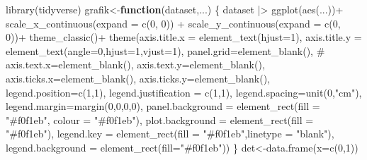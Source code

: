 \documentclass[
  letterpaper,
  DIV=11,
  numbers=noendperiod]{scrartcl}
\newenvironment{Shaded}{\begin{snugshade}}{\end{snugshade}}
\newcommand{\AttributeTok}[1]{\textcolor[rgb]{0.40,0.45,0.13}{#1}}
\newcommand{\CommentTok}[1]{\textcolor[rgb]{0.37,0.37,0.37}{#1}}
\newcommand{\ControlFlowTok}[1]{\textcolor[rgb]{0.00,0.23,0.31}{\textbf{#1}}}
\newcommand{\DecValTok}[1]{\textcolor[rgb]{0.68,0.00,0.00}{#1}}
\newcommand{\FunctionTok}[1]{\textcolor[rgb]{0.28,0.35,0.67}{#1}}
\newcommand{\NormalTok}[1]{\textcolor[rgb]{0.00,0.23,0.31}{#1}}
\newcommand{\OtherTok}[1]{\textcolor[rgb]{0.00,0.23,0.31}{#1}}
\newcommand{\SpecialCharTok}[1]{\textcolor[rgb]{0.37,0.37,0.37}{#1}}
\newcommand{\StringTok}[1]{\textcolor[rgb]{0.13,0.47,0.30}{#1}}
\begin{document}
\begin{Shaded}
\begin{Highlighting}[]
\FunctionTok{library}\NormalTok{(tidyverse)}
\NormalTok{grafik}\OtherTok{\textless{}{-}}\ControlFlowTok{function}\NormalTok{(dataset,...) \{}
\NormalTok{  dataset }\SpecialCharTok{|\textgreater{}}
    \FunctionTok{ggplot}\NormalTok{(}\FunctionTok{aes}\NormalTok{(...))}\SpecialCharTok{+}
    \FunctionTok{scale\_x\_continuous}\NormalTok{(}\AttributeTok{expand =} \FunctionTok{c}\NormalTok{(}\DecValTok{0}\NormalTok{, }\DecValTok{0}\NormalTok{)) }\SpecialCharTok{+} \FunctionTok{scale\_y\_continuous}\NormalTok{(}\AttributeTok{expand =} \FunctionTok{c}\NormalTok{(}\DecValTok{0}\NormalTok{, }\DecValTok{0}\NormalTok{))}\SpecialCharTok{+}
    \FunctionTok{theme\_classic}\NormalTok{()}\SpecialCharTok{+}
    \FunctionTok{theme}\NormalTok{(}\AttributeTok{axis.title.x =} \FunctionTok{element\_text}\NormalTok{(}\AttributeTok{hjust=}\DecValTok{1}\NormalTok{),}
        \AttributeTok{axis.title.y =} \FunctionTok{element\_text}\NormalTok{(}\AttributeTok{angle=}\DecValTok{0}\NormalTok{,}\AttributeTok{hjust=}\DecValTok{1}\NormalTok{,}\AttributeTok{vjust=}\DecValTok{1}\NormalTok{),}
        \AttributeTok{panel.grid=}\FunctionTok{element\_blank}\NormalTok{(),}
\CommentTok{\#        axis.text.x=element\_blank(),}
        \AttributeTok{axis.text.y=}\FunctionTok{element\_blank}\NormalTok{(),}
        \AttributeTok{axis.ticks.x=}\FunctionTok{element\_blank}\NormalTok{(),}
        \AttributeTok{axis.ticks.y=}\FunctionTok{element\_blank}\NormalTok{(),}
        \AttributeTok{legend.position=}\FunctionTok{c}\NormalTok{(}\DecValTok{1}\NormalTok{,}\DecValTok{1}\NormalTok{),}
        \AttributeTok{legend.justification =} \FunctionTok{c}\NormalTok{(}\DecValTok{1}\NormalTok{,}\DecValTok{1}\NormalTok{),}
        \AttributeTok{legend.spacing=}\FunctionTok{unit}\NormalTok{(}\DecValTok{0}\NormalTok{,}\StringTok{"cm"}\NormalTok{),}
        \AttributeTok{legend.margin=}\FunctionTok{margin}\NormalTok{(}\DecValTok{0}\NormalTok{,}\DecValTok{0}\NormalTok{,}\DecValTok{0}\NormalTok{,}\DecValTok{0}\NormalTok{),}
        \AttributeTok{panel.background =} \FunctionTok{element\_rect}\NormalTok{(}\AttributeTok{fill =} \StringTok{"\#f0f1eb"}\NormalTok{,}
                                        \AttributeTok{colour =} \StringTok{"\#f0f1eb"}\NormalTok{),}
        \AttributeTok{plot.background =} \FunctionTok{element\_rect}\NormalTok{(}\AttributeTok{fill =} \StringTok{"\#f0f1eb"}\NormalTok{),}
        \AttributeTok{legend.key =} \FunctionTok{element\_rect}\NormalTok{(}\AttributeTok{fill =} \StringTok{"\#f0f1eb"}\NormalTok{,}\AttributeTok{linetype =} \StringTok{"blank"}\NormalTok{),}
        \AttributeTok{legend.background =} \FunctionTok{element\_rect}\NormalTok{(}\AttributeTok{fill=}\StringTok{"\#f0f1eb"}\NormalTok{))}
\NormalTok{\}  }
\NormalTok{det}\OtherTok{\textless{}{-}}\FunctionTok{data.frame}\NormalTok{(}\AttributeTok{x=}\FunctionTok{c}\NormalTok{(}\DecValTok{0}\NormalTok{,}\DecValTok{1}\NormalTok{))}


\end{Highlighting}
\end{Shaded}
\end{document}
